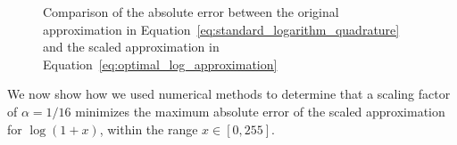 \begin{figure}[ht]
	\centering
	\caption{Comparison of the absolute error between the original approximation in Equation~\ref{eq:standard_logarithm_quadrature} and the scaled approximation in Equation~\ref{eq:optimal_log_approximation}}
	\label{fig:log_error_comparison}
\end{figure}

We now show how we used numerical methods to determine that a scaling factor of $\alpha = 1/16$ minimizes the maximum absolute error of the scaled approximation for $\log{\left(1+x\right)}$, within the range $x \in [0, 255]$.

